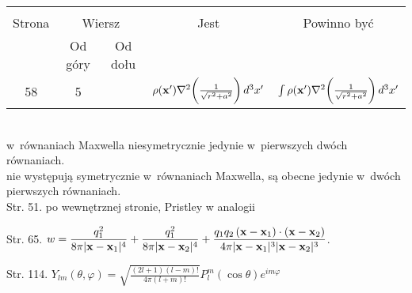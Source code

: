 \documentclass[a4paper,11pt]{article}
\begin{document}


\begin{center}

  \begin{tabular}{|c|c|c|c|c|}
    \hline
    & \multicolumn{2}{c|}{} & & \\
    Strona & \multicolumn{2}{c|}{Wiersz} & Jest
                              & Powinno być \\ \cline{2-3}
    & Od góry & Od dołu & & \\
    \hline
    58 & 5 & & $\rho( \bold{ x }' ) \nabla^{ 2 } \bigg( \frac{ 1 }{ \sqrt{ r^{ 2 } + a^{ 2 } } } \bigg) \, d^{ 3 } x'$ & $\int \rho( \bold{ x }' ) \nabla^{ 2 } \bigg( \frac{ 1 }{ \sqrt{ r^{ 2 } + a^{ 2 } } } \bigg) \, d^{ 3 } x'$ \\
    \hline
  \end{tabular}

\end{center}


\noindent
{} \\
\Jest  w~równaniach Maxwella niesymetrycznie jedynie w~pierwszych dwóch
równaniach. \\
\Powin nie występują symetrycznie w~równaniach Maxwella, są obecne jedynie
w~dwóch pierwszych równaniach. \\

Str. 51. po wewnętrznej stronie, Pristley w analogii

Str. 65. $\displaystyle w = \frac{ q^{ 2 }_{ 1 } }{ 8 \pi | \mathbf{x} - \mathbf{x}_{ 1 } |^{ 4 } } + \frac{ q^{ 2 }_{ 1 } }{ 8 \pi | \mathbf{x} - \mathbf{x}_{ 2 } |^{ 4 } } + \frac{ q_{ 1 } q_{ 2 } \, ( \mathbf{x} - \mathbf{x}_{ 1 } ) \cdot ( \mathbf{x} - \mathbf{x}_{ 2 } ) }{ 4 \pi | \mathbf{x} - \mathbf{x}_{ 1 } |^{ 3 } | \mathbf{x} - \mathbf{x}_{ 2 } |^{ 3 } }$.

Str. 114. $\displaystyle Y_{ l m }( \theta, \varphi ) = \sqrt{ \frac{ ( 2l + 1 ) ( l - m )! }{ 4 \pi ( l + m )! } } P^{ m }_{ l }( \cos \theta ) e^{ i m \varphi }$

\vspace{\spaceTwo}










\end{document}
